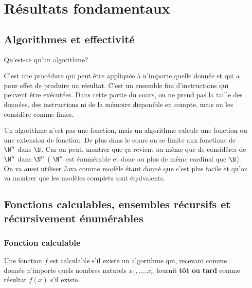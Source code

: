 
\chapter{Résultats fondamentaux}
\label{ch:r_sultats_fondamentaux}

\section{Algorithmes et effectivité}
\label{sec:algorithmes_et_effectivit_}
Qu'est-ce qu'un algorithme?

\begin{mydef}[Algorithme]
	C'est une procédure qui peut être appliquée à n'importe
	quelle donnée et qui a pour effet de produire un résultat. C'est un ensemble fini
	d'instructions qui peuvent être exécutées. Dans cette partie du cours, on ne prend pas la taille des données, des instructions ni de la mémoire disponible en compte, mais on les considère comme finies.
\end{mydef}

\begin{myrem}
	Un algorithme n'est pas une fonction, mais un algorithme calcule une fonction ou une extension de fonction.
	De plus dans le cours on se limite aux fonctions de $\N^n$ dans $\N$. Car on peut,
	montrer que ça revient au même que de considérer de $\N^n$ dans $\N^n$ (
	$\N^n$ est énumérable et donc au plus de même cardinal que $\N$). On va aussi
	utiliser Java comme modèle étant donné que c'est plus facile et qu'on va montrer
	que les modèles complets sont équivalents.
\end{myrem}


\section{Fonctions calculables, ensembles récursifs et récursivement énumérables}
\label{sec:fonctions_calculables_ensembles_r_crusids_et_r_cursivement_num_rables}

\subsection{Fonction calculable}
\label{sub:fonction_calculable}

\begin{mydef}
	Une fonction $f$ est calculable s’il existe un algorithme qui, recevant comme donnée
	n'importe quels nombres naturels $x_1,\ldots,x_n$ fournit \textbf{tôt ou tard} comme
	résultat $f(x)$ s’il existe.
\end{mydef}

